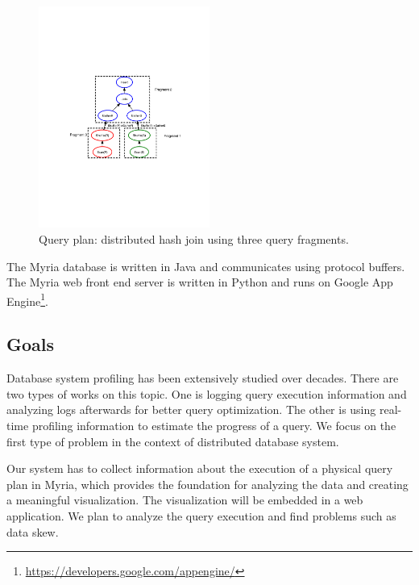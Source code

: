 \documentclass[11pt]{scrartcl}
\begin{document}
\begin{figure}
 \begin{center}
     \includegraphics[width=0.5\textwidth]{join.pdf}
   \end{center}
  \caption{Query plan: distributed hash join using three query fragments.}
  \label{fig:query_plan}
\end{figure}

The Myria database is written in Java and communicates using protocol buffers. The Myria web front end server is written in Python and runs on Google App Engine\footnote{\url{https://developers.google.com/appengine/}}.


\subsection{Goals}
\label{sec:objective}

Database system profiling has been extensively studied over decades. There are two types of works on this topic. One is logging query execution information and analyzing logs afterwards for better query optimization. The other is using real-time profiling information to estimate the progress of a query. We focus on the first type of problem in the context of distributed database system.

Our system has to collect information about the execution of a physical query plan in Myria, which provides the foundation for analyzing the data and creating a meaningful visualization. The visualization will be embedded in a web application. We plan to analyze the query execution and find problems such as data skew.

\vspace{5px}
\end{document}
